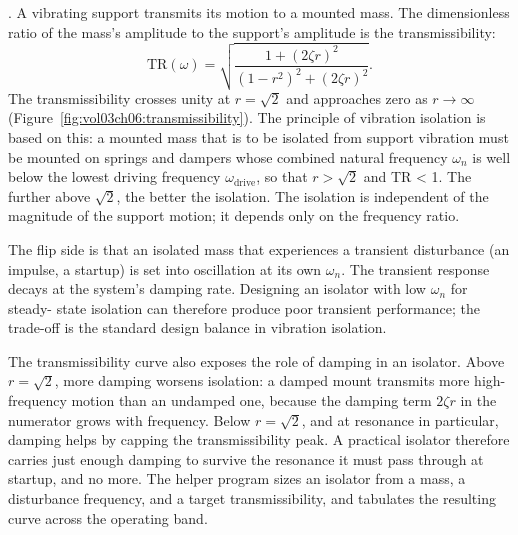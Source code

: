 

. A vibrating support transmits its
motion to a mounted mass. The dimensionless ratio of the mass's
amplitude to the support's amplitude is the transmissibility:
\[
\text{TR}(\omega) = \sqrt{\frac{1 + (2\zeta r)^2}{(1 - r^2)^2 + (2
\zeta r)^2}}.
\]
The transmissibility crosses unity at $r = \sqrt{2}$ and approaches
zero as $r \to \infty$ (Figure~\ref{fig:vol03ch06:transmissibility}).
The principle of vibration isolation is
based on this: a mounted mass that is to be isolated from support
vibration must be mounted on springs and dampers whose combined
natural frequency $\omega_n$ is well below the lowest driving
frequency $\omega_{\text{drive}}$, so that $r > \sqrt{2}$ and TR <
1. The further above $\sqrt{2}$, the better the isolation. The
isolation is independent of the magnitude of the support motion; it
depends only on the frequency ratio.

The flip side is that an isolated mass that experiences a transient
disturbance (an impulse, a startup) is set into oscillation at its
own $\omega_n$. The transient response decays at the system's
damping rate. Designing an isolator with low $\omega_n$ for steady-
state isolation can therefore produce poor transient performance;
the trade-off is the standard design balance in vibration isolation.



The transmissibility curve also exposes the role of damping in an
isolator. Above $r = \sqrt2$, more damping worsens isolation: a
damped mount transmits more high-frequency motion than an undamped
one, because the damping term $2\zeta r$ in the numerator grows with
frequency. Below $r = \sqrt2$, and at resonance in particular, damping
helps by capping the transmissibility peak. A practical isolator
therefore carries just enough damping to survive the resonance it
must pass through at startup, and no more. The helper program
 sizes an isolator from a mass, a
disturbance frequency, and a target transmissibility, and tabulates
the resulting curve across the operating band.

